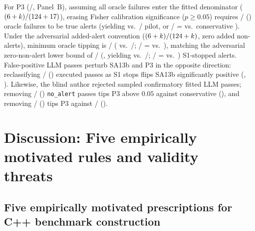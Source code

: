 \documentclass[11pt]{article}
\begin{document}
For P3 (\BenchPThreeCount{}/\BenchFittedClusters{}, Panel~B), assuming all \BenchOracleFailN{} oracle failures enter the fitted denominator ($(6{}+k)/(124{}+17{})$), erasing Fisher calibration significance ($p \ge 0.05$) requires \BenchPThreeOracleTipN{}/\BenchOracleFailN{} (\BenchPThreeOracleTipPct{}) oracle failures to be true alerts (yielding \BenchPThreeOracleTipResultPct{} vs.\ \BenchPilotAlertN{}/\BenchPilotFitN{} pilot, or \BenchPThreeOracleTipConservN{}/\BenchOracleFailN{} = \BenchPThreeOracleTipConservPct{} vs.\ conservative \BenchPilotConservFrac{}).
Under the adversarial added-alert convention ($(6{}+k)/(124{}+k)$, zero added non-alerts), minimum oracle tipping is \BenchPThreeOracleAdvTipN{}/\BenchOracleFailN{} (\BenchPThreeOracleAdvTipPct{} vs.\ \BenchPilotAlertN{}/\BenchPilotFitN{}; \BenchPThreeOracleAdvTipConservN{}/\BenchOracleFailN{} = \BenchPThreeOracleAdvTipConservPct{} vs.\ \BenchPilotConservFrac{}), matching the adversarial zero-non-alert lower bound of \BenchPThreeSOneTipN{}/\BenchRatedDeskStopRepsN{} (\BenchPThreeSOneTipPct{}, yielding \BenchPThreeSOneTipResultPct{} vs.\ \BenchPilotAlertN{}/\BenchPilotFitN{}; \BenchPThreeSOneTipConservN{}/\BenchRatedDeskStopRepsN{} = \BenchPThreeSOneTipConservPct{} vs.\ \BenchPilotConservFrac{}) S1-stopped alerts.
False-positive LLM passes perturb SA13b and P3 in the opposite direction: reclassifying \BenchSAThirteenFpTipN{}/\BenchPOneCount{} (\BenchSAThirteenFpTipPct{}) executed passes as S1 stops flips SA13b significantly positive (\BenchSAThirteenFpTipDelta{}, \BenchSAThirteenFpTipP{}).
Likewise, the blind author rejected \BenchAuthConfFitRejFrac{} sampled confirmatory fitted LLM passes; removing \BenchPThreeFpTipConservN{}/\BenchNoAlertN{} (\BenchPThreeFpTipConservPct{}) \texttt{no\_alert} passes tips P3 above $0.05$ against conservative \BenchPilotConservFrac{} (\BenchPThreeFpTipConservP{}), and removing \BenchPThreeFpTipFullN{}/\BenchNoAlertN{} (\BenchPThreeFpTipFullPct{}) tips P3 against \BenchPilotAlertN{}/\BenchPilotFitN{} (\BenchPThreeFpTipFullP{}).

\section{Discussion: Five empirically motivated rules and validity threats}
\label{sec:discussion}

\subsection{Five empirically motivated prescriptions for C++ benchmark construction}
\end{document}
